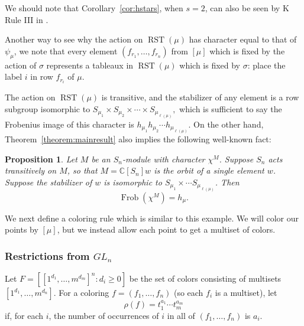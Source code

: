 \documentclass[a4paper,12pt]{amsart}
\theoremstyle{plain}
\newtheorem{proposition}[theorem]{Proposition}
\theoremstyle{definition}
\theoremstyle{remark}
\DeclareMathOperator{\Frob}{Frob}
\DeclareMathOperator{\RST}{RST}
\begin{document}
\noindent We should note that Corollary~\ref{cor:hstars}, when $s=2$, can also be seen by K Rule III in \cite{GarsiaRemmel}.

Another way to see why the action on $\RST(\mu)$ has character equal to that of $\psi_\mu$, we note that every element $(f_{r_1},\dots, f_{r_n})$ from $[\mu]$ which is fixed by the action of $\sigma$ represents a tableaux in $\RST(\mu)$ which is fixed by $\sigma$: place the label $i$ in row $f_{r_i}$ of $\mu$.

The action on $\RST(\mu)$ is transitive, and the stabilizer of any element is a row subgroup isomorphic to 
$
S_{\mu_1} \times S_{\mu_2} \times \cdots \times S_{\mu_{\ell(\mu)}},
$
which is sufficient to say the Frobenius image of this character is $h_{\mu_1} h_{\mu_2} \cdots h_{\mu_{\ell(\mu)}}$. On the other hand, Theorem~\ref{theorem:mainresult} also implies the following well-known fact:
\begin{proposition} Let $M$ be an $S_n$-module with character $\chi^M$. Suppose $S_n$ acts transitively on $M$, so that $M = \mathbb{C}[S_n] w$ is the orbit of a single element $w$.
Suppose the stabilizer of $w$ is isomorphic to $S_{\mu_1} \times \cdots S_{\mu_{\ell(\mu)}}$. Then
$$
\Frob(\chi^M) = h_{\mu}.
$$
\end{proposition}


We next define a coloring rule which is similar to this example. We will color our points by $[\mu]$, but we instead allow each point to get a multiset of colors.

\subsubsection{Restrictions from \texorpdfstring{$GL_n$}{GLn}}

Let $F= [ [1^{d_1},\dots, m^{d_m}]^{ n}: d_i \geq 0 ] $ be the set of colors consisting of multisets $[1^{d_1},\dots, m^{d_n}]$. For a coloring $f=(f_1,\dots,f_n)$ (so each $f_i$ is a multiset), let 
$$
\rho(f) = t_1^{a_1} \cdots t_{m}^{a_m}
$$
if, for each $i$, the number of occurrences of $i$ in all of $(f_1,\dots,f_n)$ is $a_i$.
\\
\end{document}
